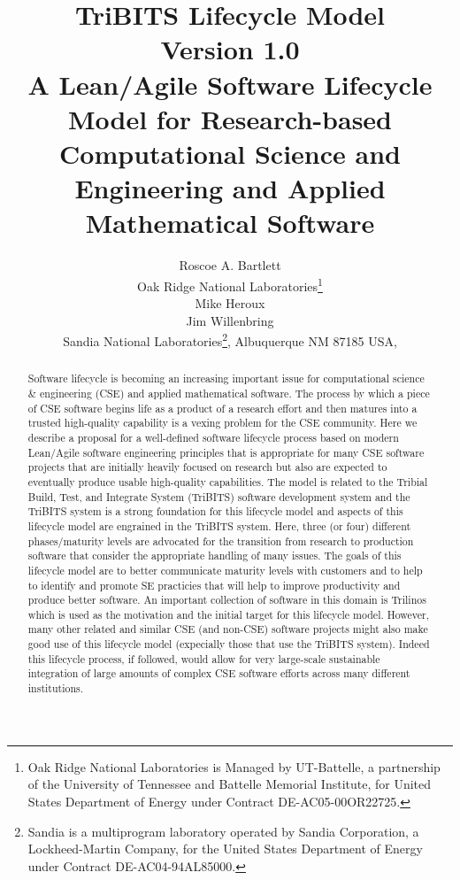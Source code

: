 \documentclass[11pt]{SANDreport}
\title{\center
TriBITS Lifecycle Model \\[2ex] Version 1.0 \\[2ex] \large A
Lean/Agile Software Lifecycle Model for Research-based Computational
Science and Engineering and Applied Mathematical Software }
\author{
Roscoe A. Bartlett \\ Oak Ridge National Laboratories\footnote{Oak
Ridge National Laboratories is Managed by UT-Battelle, a partnership
of the University of Tennessee and Battelle Memorial Institute, for
United States Department of Energy under Contract DE-AC05-00OR22725.} 
\\[2ex] Mike Heroux \\ Jim Willenbring \\ Sandia
National Laboratories\footnote{Sandia is a multiprogram laboratory
operated by Sandia Corporation, a Lockheed-Martin Company, for the
United States Department of Energy under Contract DE-AC04-94AL85000.},
Albuquerque NM 87185 USA, \\ }
\date{}
\begin{document}

\maketitle

%

%
\begin{abstract}
%

Software lifecycle is becoming an increasing important issue for
computational science \& engineering (CSE) and applied mathematical
software.  The process by which a piece of CSE software begins life as
a product of a research effort and then matures into a trusted
high-quality capability is a vexing problem for the CSE community.
Here we describe a proposal for a well-defined software lifecycle
process based on modern Lean/Agile software engineering principles
that is appropriate for many CSE software projects that are initially
heavily focused on research but also are expected to eventually
produce usable high-quality capabilities.   The model is related to the
Tribial Build, Test, and Integrate System (TriBITS) software development
system and the TriBITS system is a strong foundation for this lifecycle
model and aspects of this lifecycle model are engrained in the
TriBITS system.  Here, three (or four) different
phases/maturity levels are advocated for the transition from research
to production software that consider the appropriate handling of many
issues.  The goals of this lifecycle model are to better communicate
maturity levels with customers and to help to identify and promote SE
practicies that will help to improve productivity and produce better
software.  An important collection of software in this domain is
Trilinos which is used as the motivation and the initial target for
this lifecycle model.  However, many other related and similar CSE
(and non-CSE) software projects might also make good use of this
lifecycle model (expecially those that use the TriBITS system).
Indeed this lifecycle process, if followed, would
allow for very large-scale sustainable integration of large amounts of
complex CSE software efforts across many different institutions.

%
\end{abstract}
%

%
%
%
\end{document}
